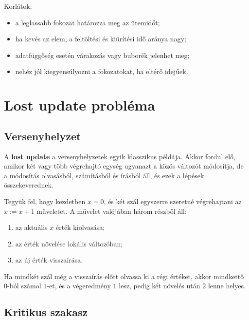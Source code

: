 Korlátok:

\begin{itemize}
  \item a leglassabb fokozat határozza meg az ütemidőt;
  \item ha kevés az elem, a feltöltési és kiürítési idő aránya nagy;
  \item adatfüggőség esetén várakozás vagy buborék jelenhet meg;
  \item nehéz jól kiegyensúlyozni a fokozatokat, ha eltérő idejűek.
\end{itemize}

\section{Lost update probléma}

\subsection{Versenyhelyzet}

A \textbf{lost update} a versenyhelyzetek egyik klasszikus példája. Akkor fordul elő, amikor két vagy több végrehajtó egység ugyanazt a közös változót módosítja, de a módosítás olvasásból, számításból és írásból áll, és ezek a lépések összekeverednek.

Tegyük fel, hogy kezdetben $x=0$, és két szál egyszerre szeretné végrehajtani az $x:=x+1$ műveletet. A művelet valójában három részből áll:

\begin{enumerate}
  \item az aktuális $x$ érték kiolvasása;
  \item az érték növelése lokális változóban;
  \item az új érték visszaírása.
\end{enumerate}

Ha mindkét szál még a visszaírás előtt olvassa ki a régi értéket, akkor mindkettő $0$-ból számol $1$-et, és a végeredmény $1$ lesz, pedig két növelés után $2$ lenne helyes.




\subsection{Kritikus szakasz}

